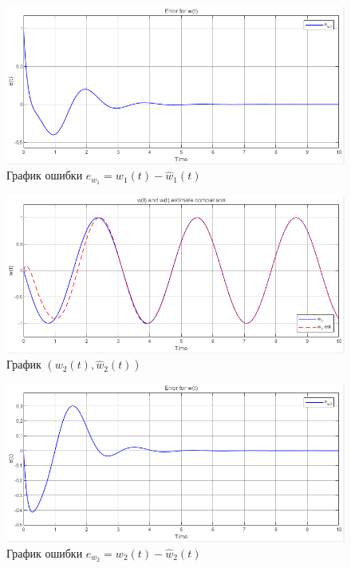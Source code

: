 \documentclass[a4paper, 12pt]{article}
\begin{document}
    \begin{figure}[H]
        \centering
        \includegraphics[scale=0.75]{2task_ew1.png}
        \captionsetup{skip=0pt}
        \caption{График ошибки $e_{w_1}=w_1(t)-\hat{w}_1(t)$}
        \label{fig:2task_ew1}
    \end{figure}
    \begin{figure}[H]
        \centering
        \includegraphics[scale=0.75]{2task_w2.png}
        \captionsetup{skip=0pt}
        \caption{График $(w_2(t),\hat{w}_2(t))$}
        \label{fig:2task_w2}
    \end{figure}
    \begin{figure}[H]
        \centering
        \includegraphics[scale=0.75]{2task_ew2.png}
        \captionsetup{skip=0pt}
        \caption{График ошибки $e_{w_2}=w_2(t)-\hat{w}_2(t)$}
        \label{fig:2task_ew2}
    \end{figure}
\end{document}
